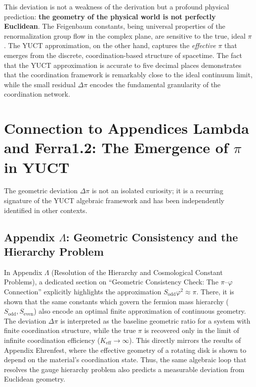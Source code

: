 \documentclass[12pt,a4paper]{article}
\begin{document}
{	This deviation is not a weakness of the derivation but a profound physical prediction: \textbf{the geometry of the physical world is not perfectly Euclidean}. The Feigenbaum constants, being universal properties of the renormalization group flow in the complex plane, are sensitive to the true, ideal \(\pi\). The YUCT approximation, on the other hand, captures the \textit{effective} \(\pi\) that emerges from the discrete, coordination-based structure of spacetime. The fact that the YUCT approximation is accurate to five decimal places demonstrates that the coordination framework is remarkably close to the ideal continuum limit, while the small residual \(\Delta\pi\) encodes the fundamental granularity of the coordination network.
	
	\section{Connection to Appendices Lambda and Ferra1.2: The Emergence of \(\pi\) in YUCT}
	
	The geometric deviation \(\Delta\pi\) is not an isolated curiosity; it is a recurring signature of the YUCT algebraic framework and has been independently identified in other contexts.
	
	\subsection{Appendix \(\Lambda\): Geometric Consistency and the Hierarchy Problem}
	
	In Appendix \(\Lambda\) (Resolution of the Hierarchy and Cosmological Constant Problems), a dedicated section on ``Geometric Consistency Check: The \(\pi\)–\(\varphi\) Connection'' explicitly highlights the approximation \(S_{\mathrm{odd}}\varphi^2 \approx \pi\). There, it is shown that the same constants which govern the fermion mass hierarchy (\(S_{\mathrm{odd}}, S_{\mathrm{even}}\)) also encode an optimal finite approximation of continuous geometry. The deviation \(\Delta\pi\) is interpreted as the baseline geometric ratio for a system with finite coordination structure, while the true \(\pi\) is recovered only in the limit of infinite coordination efficiency (\(K_{\mathrm{eff}} \to \infty\)). This directly mirrors the results of Appendix Ehrenfest, where the effective geometry of a rotating disk is shown to depend on the material's coordination state. Thus, the same algebraic loop that resolves the gauge hierarchy problem also predicts a measurable deviation from Euclidean geometry.
	
}
\end{document}
